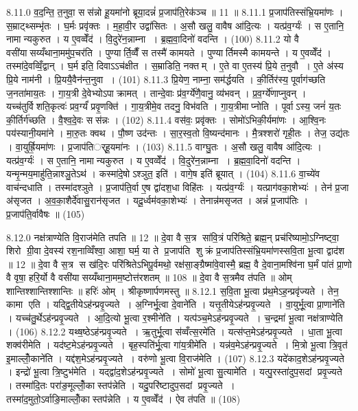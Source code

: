 8.11.0
व॒द॒न्ति॒ त॒नुवा॒ सस॑न्नो हू॒यमा॑नो ब्रूया॒दन्नं॑ प्र॒जाप॑ति॒रेक॑ञ्च ॥ 11 ॥
8.11.1
प्र॒जाप॑तिस्संभ्रि॒यमा॑णः । स॒म्राट्थ्सम्भृ॑तः । घ॒र्मः प्रवृ॑क्तः । म॒हा॒वी॒र उद्वा॑सितः । अ॒सौ खलु॒ वावैष आ॑दि॒त्यः । यत्प्र॑व॒र्ग्यः॑ । स ए॒तानि॒ नामान्यकुरुत । य ए॒वव्वेँद॑ । वि॒दुरे॑न॒न्नाम्ना । ब्र॒ह्म॒वा॒दिनो॑ वदन्ति । (100)
8.11.2
यो वै वसी॑यासय्यँथाना॒ममु॑प॒चर॑ति । पुण्यार्ति॒व्वैँ स तस्मै॑ कामयते । पुण्यार्तिमस्मै कामयन्ते । य ए॒वव्वेँद॑ । तस्मा॑दे॒वव्विँ॒द्वान् । घ॒र्म इति॒ दिवाऽऽच॑क्षीत । स॒म्राडिति॒ नक्तम् । ए॒ते वा ए॒तस्य॑ प्रि॒ये त॒नुवौ । ए॒ते अ॑स्य प्रि॒ये नाम॑नी । प्रि॒ययै॒वैन॑न्त॒नुवा । (101)
8.11.3
प्रि॒येण॒ नाम्ना॒ सम॑र्द्धयति । की॒र्तिर॑स्य॒ पूर्वाग॑च्छति ज॒नता॑माय॒तः । गा॒य॒त्री दे॒वेभ्योऽपाक्रामत् । तान्दे॒वाः प्र॑व॒र्ग्ये॑णै॒वानु॒ व्य॑भवन् । प्र॒व॒र्ग्ये॑णाप्नुवन् । यच्च॑तुर्विशति॒कृत्वः॑ प्रव॒र्ग्यं॑ प्रवृ॒णक्ति॑ । गा॒य॒त्रीमे॒व तदनु॒ विभ॑वति । गा॒य॒त्रीमाप्नोति । पूर्वाऽस्य॒ जनं॑ य॒तः की॒र्तिर्ग॑च्छति । वै॒श्व॒दे॒वः सस॑न्नः । (102)
8.11.4
वस॑वः॒ प्रवृ॑क्तः । सोमो॑ऽभिकी॒र्यमा॑णः । आ॒श्वि॒नः पय॑स्यानी॒यमा॑ने । मा॒रु॒तः क्वथ\sn{} । पौ॒ष्ण उद॑न्तः । सा॒र॒स्व॒तो वि॒ष्यन्द॑मानः । मै॒त्रश्शरो॑ गृही॒तः । तेज॒ उद्य॑तः । वा॒युर्ह्रि॒यमा॑णः । प्र॒जाप॑तिर््हू॒यमा॑नः । (103)
8.11.5
वाग्घु॒तः । अ॒सौ खलु॒ वावैष आ॑दि॒त्यः । यत्प्र॑व॒र्ग्यः॑ । स ए॒तानि॒ नामान्यकुरुत । य ए॒वव्वेँद॑ । वि॒दुरे॑न॒न्नाम्ना । ब्र॒ह्म॒वा॒दिनो॑ वदन्ति । यन्मृ॒न्मय॒माहु॑ति॒न्नाश्ञु॒तेऽथ॑ । कस्मा॑दे॒षोऽश्ञुत॒ इति॑ । वागे॒ष इति॑ ब्रूयात् । (104)
8.11.6
वा॒च्ये॑व वाच॑न्दधाति । तस्मा॑दश्ञुते । प्र॒जाप॑ति॒र्वा ए॒ष द्वा॑दश॒धा विहि॑तः । यत्प्र॑व॒र्ग्यः॑ । यत्प्राग॑वका॒शेभ्यः॑ । तेन॑ प्र॒जा अ॑सृजत । अ॒व॒का॒शैर्दे॑वासु॒रान॑सृजत । यदू॒र्ध्वम॑वका॒शेभ्यः॑ । तेनान्न॑मसृजत । अन्नं॑ प्र॒जाप॑तिः । प्र॒जाप॑ति॒र्वावैषः ॥ (105)
\anuvakamend

8.12.0
नक्ष॑त्राण्येति वि॒राज॑मेति तपति ॥ 12 ॥ दे॒वा वै स॒त्र सा॑वि॒त्रं परि॑श्रिते॒ ब्रह्म॒न् प्रच॑रिष्यामो॒ऽग्निष्ट्वा॒ शिरो ग्री॒वा दे॒वस्य॑ रश॒नाव्विँश्वा॒ आशा॒ घर्म॒ या ते प्र॒जाप॑ति शुक्रं प्र॒जाप॑तिस्संभ्रि॒यमा॑णस्सवि॒ता भू॒त्वा द्वाद॑श ॥ 12 ॥ दे॒वा वै स॒त्र स ख॑दि॒रः परि॑श्रितेऽभिपू॒र्वमथो॒ रक्ष॑सा॒ङ्ग्रैष्मा॑वे॒वास्मै॒ ब्रह्म॒ वै दे॒वाना॒मश्वि॑ना घ॒र्मं पा॑तं प्रा॒णो वै वृषा॒ हरि॒र्यो वै वसी॑यासय्यँथाना॒मम॒ष्टोत्त॑रशतम् ॥ 108 ॥ दे॒वा वै स॒त्रमैव त॑पति ॥ ओम् शान्तिश्शान्तिश्शान्तिः ॥ हरिः॑ ओम् । श्रीकृष्णार्पणमस्तु ॥
8.12.1
स॒वि॒ता भू॒त्वा प्र॑थ॒मेऽह॒न्प्रवृ॑ज्यते । तेन॒ कामा एति । यद्द्वि॒तीयेऽह॑न्प्रवृ॒ज्यते । अ॒ग्निर्भू॒त्वा दे॒वाने॑ति । यत्तृ॒तीयेऽह॑न्प्रवृ॒ज्यते । वा॒युर्भू॒त्वा प्रा॒णाने॑ति । यच्च॑तु॒र्थेऽह॑न्प्रवृ॒ज्यते । आ॒दि॒त्यो भू॒त्वा र॒श्मीने॑ति । यत्प॑ञ्च॒मेऽह॑न्प्रवृ॒ज्यते । च॒न्द्रमा॑ भू॒त्वा नक्ष॑त्राण्येति । (106)
8.12.2
यथ्ष॒ष्ठेऽह॑न्प्रवृ॒ज्यते । ऋ॒तुर्भू॒त्वा स॑व्वँत्स॒रमे॑ति । यत्स॑प्त॒मेऽह॑न्प्रवृ॒ज्यते । धा॒ता भू॒त्वा शक्व॑रीमेति । यद॑ष्ट॒मेऽह॑न्प्रवृ॒ज्यते । बृह॒स्पति॑र्भू॒त्वा गा॑य॒त्रीमे॑ति । यन्न॑व॒मेऽह॑न्प्रवृ॒ज्यते । मि॒त्रो भू॒त्वा त्रि॒वृत॑ इ॒माल्लोँ॒काने॑ति । यद्द॑श॒मेऽह॑न्प्रवृ॒ज्यते । वरु॑णो भू॒त्वा वि॒राज॑मेति । (107)
8.12.3
यदे॑काद॒शेऽह॑न्प्रवृ॒ज्यते । इन्द्रो॑ भू॒त्वा त्रि॒ष्टुभ॑मेति । यद्द्वा॑द॒शेऽह॑न्प्रवृ॒ज्यते । सोमो॑ भू॒त्वा सु॒त्यामे॑ति । यत्पु॒रस्ता॑दुप॒सदां प्रवृ॒ज्यते । तस्मा॑दि॒तः परा॑ङ॒मूल्लोँ॒कास्तप॑न्नेति । यदु॒परि॑ष्टादुप॒सदां प्रवृ॒ज्यते । तस्मा॑द॒मुतो॒ऽर्वाङि॒माल्लोँ॒कास्तप॑न्नेति । य ए॒वव्वेँद॑ । ऐव त॑पति ॥ (108)

